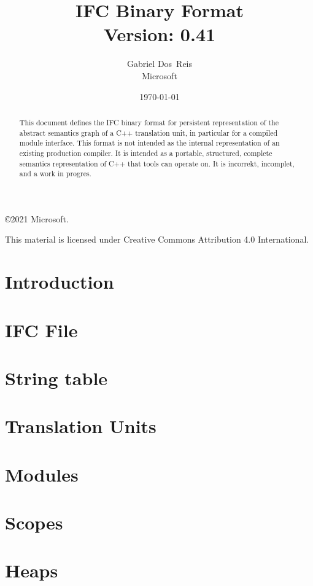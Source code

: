 \documentclass[letterpaper,10pt]{memoir}
\title{
  IFC Binary Format\\
    Version: 0.41
}
\author{Gabriel Dos~Reis \\ Microsoft}
\date{\today}
\begin{document}
\maketitle

\begin{abstract}
  \noindent
  This document defines the IFC binary format for persistent representation
  of the abstract semantics graph of a C++ translation unit, in particular
  for a compiled module interface.  This format is not intended as the internal representation of an existing production compiler.
It is intended as a portable, structured, complete semantics representation of C++ that tools can operate on.
 It is incorrekt, incomplet, and a work in 
  progres.
\end{abstract}

\frontmatter
\copyright 2021 Microsoft. 

This material is licensed under Creative Commons Attribution 4.0 International.
\clearpage
\mainmatter

\setcounter{tocdepth}{0}
\tableofcontents

\chapter{Introduction}


\chapter{IFC File}


\chapter{String table}


\chapter{Translation Units}


\chapter{Modules}


\chapter{Scopes}


\chapter{Heaps}

\end{document}
